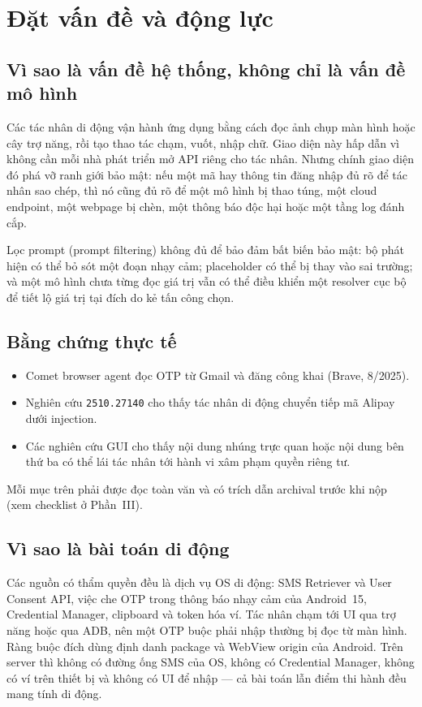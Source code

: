 \documentclass[11pt,a4paper]{article}
\newcommand{\code}[1]{\texttt{\small #1}}
\begin{document}
\section{Đặt vấn đề và động lực}

\subsection{Vì sao là vấn đề hệ thống, không chỉ là vấn đề mô hình}

Các tác nhân di động vận hành ứng dụng bằng cách đọc ảnh chụp màn hình hoặc cây trợ năng, rồi tạo thao tác
chạm, vuốt, nhập chữ. Giao diện này hấp dẫn vì không cần mỗi nhà phát triển mở API riêng cho tác nhân.
Nhưng chính giao diện đó phá vỡ ranh giới bảo mật: nếu một mã hay thông tin đăng nhập đủ rõ để tác nhân
sao chép, thì nó cũng đủ rõ để một mô hình bị thao túng, một cloud endpoint, một webpage bị chèn, một thông
báo độc hại hoặc một tầng log đánh cắp.

Lọc prompt (prompt filtering) không đủ để bảo đảm bất biến bảo mật: bộ phát hiện có thể bỏ sót một đoạn nhạy
cảm; placeholder có thể bị thay vào sai trường; và một mô hình chưa từng đọc giá trị vẫn có thể điều khiển
một resolver cục bộ để tiết lộ giá trị tại đích do kẻ tấn công chọn.

\subsection{Bằng chứng thực tế}
\label{sec:evidence}

\begin{itemize}
  \item Comet browser agent đọc OTP từ Gmail và đăng công khai (Brave, 8/2025).
  \item Nghiên cứu \code{2510.27140} cho thấy tác nhân di động chuyển tiếp mã Alipay dưới injection.
  \item Các nghiên cứu GUI cho thấy nội dung nhúng trực quan hoặc nội dung bên thứ ba có thể lái tác nhân
        tới hành vi xâm phạm quyền riêng tư.
\end{itemize}
Mỗi mục trên phải được đọc toàn văn và có trích dẫn archival trước khi nộp (xem checklist ở Phần~III).

\subsection{Vì sao là bài toán di động}

Các nguồn có thẩm quyền đều là dịch vụ OS di động: SMS Retriever và User Consent API, việc che OTP trong
thông báo nhạy cảm của Android~15, Credential Manager, clipboard và token hóa ví. Tác nhân chạm tới UI qua
trợ năng hoặc qua ADB, nên một OTP buộc phải nhập thường bị đọc từ màn hình. Ràng buộc đích dùng định danh
package và WebView origin của Android. Trên server thì không có đường ống SMS của OS, không có Credential
Manager, không có ví trên thiết bị và không có UI để nhập --- cả bài toán lẫn điểm thi hành đều mang tính di động.
\end{document}
